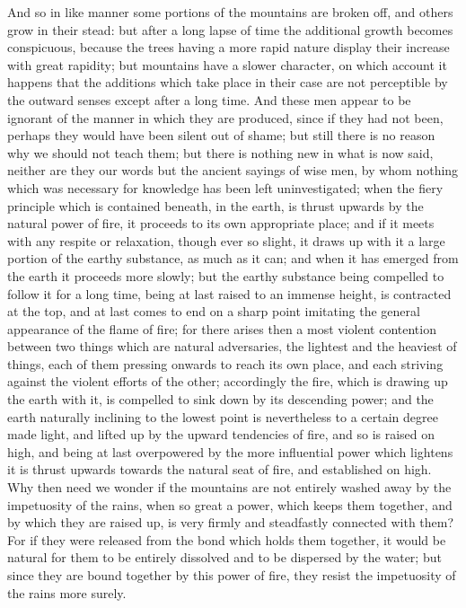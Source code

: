 And so in like manner some portions of the mountains are broken off, and others grow in their
stead: but after a long lapse of time the additional growth becomes conspicuous, because the
trees having a more rapid nature display their increase with great rapidity; but mountains have a
slower character, on which account it happens that the additions which take place in their case are
not perceptible by the outward senses except after a long time. And these men appear to be
ignorant of the manner in which they are produced, since if they had not been, perhaps they would
have been silent out of shame; but still there is no reason why we should not teach them; but there
is nothing new in what is now said, neither are they our words but the ancient sayings of wise men,
by whom nothing which was necessary for knowledge has been left uninvestigated; when the fiery
principle which is contained beneath, in the earth, is thrust upwards by the natural power of fire, it
proceeds to its own appropriate place; and if it meets with any respite or relaxation, though ever so
slight, it draws up with it a large portion of the earthy substance, as much as it can; and when it has
emerged from the earth it proceeds more slowly; but the earthy substance being compelled to
follow it for a long time, being at last raised to an immense height, is contracted at the top, and at
last comes to end on a sharp point imitating the general appearance of the flame of fire; for there
arises then a most violent contention between two things which are natural adversaries, the lightest
and the heaviest of things, each of them pressing onwards to reach its own place, and each
striving against the violent efforts of the other; accordingly the fire, which is drawing up the earth
with it, is compelled to sink down by its descending power; and the earth naturally inclining to the
lowest point is nevertheless to a certain degree made light, and lifted up by the upward tendencies
of fire, and so is raised on high, and being at last overpowered by the more influential power which
lightens it is thrust upwards towards the natural seat of fire, and established on high. Why then
need we wonder if the mountains are not entirely washed away by the impetuosity of the rains,
when so great a power, which keeps them together, and by which they are raised up, is very firmly
and steadfastly connected with them? For if they were released from the bond which holds them
together, it would be natural for them to be entirely dissolved and to be dispersed by the water; but
since they are bound together by this power of fire, they resist the impetuosity of the rains more
surely.

